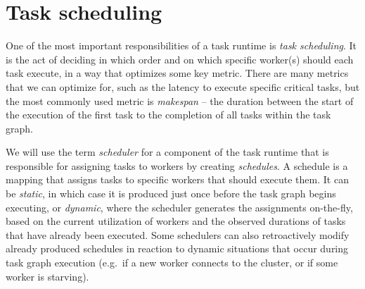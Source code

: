 \section{Task scheduling}
One of the most important responsibilities of a task runtime is \emph{task scheduling}. It is the
act of deciding in which order and on which specific worker(s) should each task execute, in a way
that optimizes some key metric. There are many metrics that we can optimize for, such as the
latency to execute specific critical tasks, but the most commonly used metric is
\emph{makespan} -- the duration between the start of the execution of the first task to the
completion of all tasks within the task graph.

We will use the term \emph{scheduler} for a component of the task runtime that is responsible
for assigning tasks to workers by creating \emph{schedules}. A schedule is a mapping that
assigns tasks to specific workers that should execute them. It can be \emph{static}, in
which case it is produced just once before the task graph begins executing, or
\emph{dynamic}, where the scheduler generates the assignments on-the-fly, based on the
current utilization of workers and the observed durations of tasks that have already been executed.
Some schedulers can also retroactively modify already produced schedules in reaction to dynamic
situations that occur during task graph execution (e.g.\ if a new worker connects to the cluster,
or if some worker is starving).

